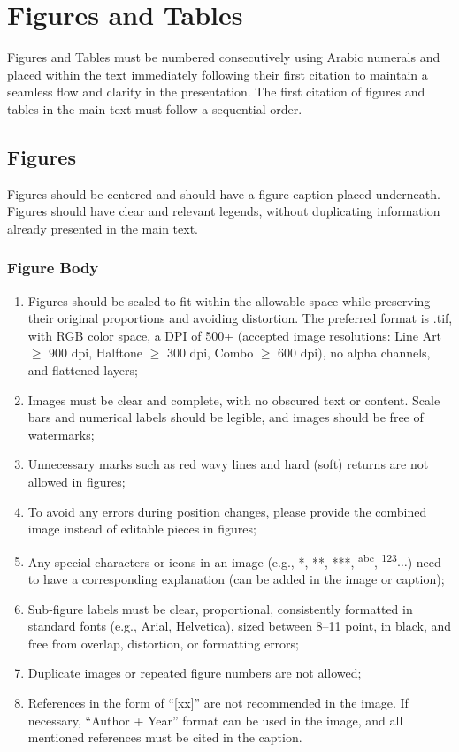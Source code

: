 \documentclass[journal,article,submit,moreauthors,pdftex]{Definitions/tsp}
\begin{document}
\section{Figures and Tables} \label{sect:s3}
Figures and Tables must be numbered consecutively using Arabic numerals and placed within the text immediately following their first citation to maintain a seamless flow and clarity in the presentation. The first citation of figures and tables in the main text must follow a sequential order.

\subsection{Figures} \label{sect:s3dot1}
Figures should be centered and should have a figure caption placed underneath. Figures should have clear and relevant legends, without duplicating information already presented in the main text.

\subsubsection{Figure Body} \label{sect:s3dot1dot1}
\begin{enumerate}[label=$\bullet$]
\item Figures should be scaled to fit within the allowable space while preserving their original proportions and avoiding distortion. The preferred format is .tif, with RGB color space, a DPI of 500+ (accepted image resolutions: Line Art $\geq$ 900 dpi, Halftone $\geq$ 300 dpi, Combo $\geq$ 600 dpi), no alpha channels, and flattened layers;
\item Images must be clear and complete, with no obscured text or content. Scale bars and numerical labels should be legible, and images should be free of watermarks;
\item Unnecessary marks such as red wavy lines and hard (soft) returns are not allowed in figures;
\item To avoid any errors during position changes, please provide the combined image instead of editable pieces in figures;
\item Any special characters or icons in an image (e.g., *, **, ***, \textsuperscript{abc}, \textsuperscript{123}$\dots$) need to have a corresponding explanation (can be added in the image or caption);
\item Sub-figure labels must be clear, proportional, consistently formatted in standard fonts (e.g., Arial, Helvetica), sized between 8--11 point, in black, and free from overlap, distortion, or formatting errors;
\item Duplicate images or repeated figure numbers are not allowed;
\item References in the form of “[xx]” are not recommended in the image. If necessary, “Author + Year” format can be used in the image, and all mentioned references must be cited in the caption.
\end{enumerate}
\end{document}
